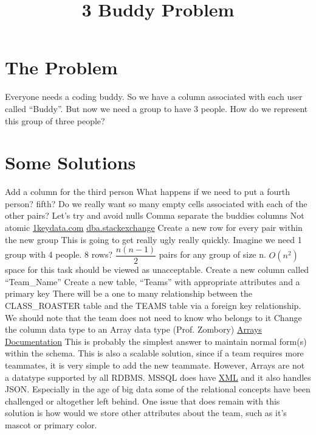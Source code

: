\documentclass{article}
\title{3 Buddy Problem}
\begin{document}
\maketitle

\section{The Problem}
Everyone needs a coding buddy. So we have a column associated with each user called “Buddy”. But now we need a group to have 3 people. How do we represent this group of three people?

\section{Some Solutions}
\begin{outline}[enumerate]
    \1 Add a column for the third person
        \2 What happens if we need to put a fourth person? fifth?
        \2 Do we really want so many empty cells associated with each of the other pairs?
            \3 Let’s try and avoid nulls
    \1 Comma separate the buddies columns
        \2 Not atomic
            \3 \href{https://www.1keydata.com/database-normalization/first-normal-form-1nf.php#:~:text=An\%20atomic\%20value\%20is\%20a,columns\%20that\%20are\%20closely\%20related.}{1keydata.com}
            \3 \href{https://dba.stackexchange.com/questions/2342/what-is-atomic-relation-in-first-normal-form}{dba.stackexchange}
    \1 Create a new row for every pair within the new group
        \2 This is going to get really ugly really quickly. Imagine we need 1 group with 4 people. 8 rows?
        \2 $\dfrac{n(n-1)}{2}$ pairs for any group of size n.
        \2 $O(n^2)$ space for this task should be viewed as unacceptable.
    \1 Create a new column called “Team\_Name”
        \2 Create a new table, “Teams'' with appropriate attributes and a primary key
        \2 There will be a one to many relationship between the CLASS\_ROASTER table and the TEAMS table via a foreign key relationship.
        \2 We should note that the team does not need to know who belongs to it
    \1 Change the column data type to an Array data type (Prof. Zombory)
        \2 \href{https://www.postgresql.org/docs/9.1/arrays.html}{Arrays Documentation}
        \2 This is probably the simplest answer to maintain normal form(s) within the schema.
        \2 This is also a scalable solution, since if a team requires more teammates, it is very simple to add the new teammate.
        \2 However, Arrays are not a datatype supported by all RDBMS.
            \3 MSSQL does have \href{https://docs.microsoft.com/en-us/sql/relational-databases/xml/xml-data-type-and-columns-sql-server?view=sql-server-ver15}{XML} and it also handles JSON. Especially in the age of big data some of the relational concepts have been challenged or altogether left behind.     
        \2 One issue that does remain with this solution is how would we store other attributes about the team, such as it's mascot or primary color.
\end{outline}
\end{document}

